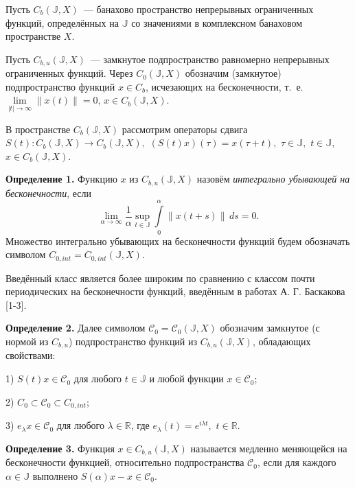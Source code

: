 


\vzmscaption


Пусть $C_b(\mathbb{J},X)$~--- банахово пространство непрерывных ограниченных функций,
определённых на $\mathbb{J}$ со значениями в комплексном банаховом пространстве $X$.

Пусть $C_{b,u}(\mathbb{J},X)$~--- замкнутое подпространство равномерно непрерывных ограниченных функций. Через $C_0(\mathbb{J},X)$ обозначим (замкнутое) подпространство функций $x\in C_b$,
 исчезающих на бесконечности, т.~е. $\lim\limits_{|t|\rightarrow\infty}\|x(t)\|=0$, $x\in C_b(\mathbb{J},X)$.

В пространстве $C_{b}(\mathbb{J},X)$ рассмотрим операторы сдвига $S(t):C_{b}(\mathbb{J},X)\rightarrow C_{b}(\mathbb{J},X),$ $(S(t)x)(\tau) = x(\tau + t),$ $\tau\in\mathbb{J},$ $t\in\mathbb{J},$ $x\in C_{b}(\mathbb{J},X)$.


\textbf{Определение 1.} Функцию  $x$ из $C_{b,u}(\mathbb{J},X)$ назовём \emph{интегрально убывающей на бесконечности},
если $$\lim\limits_{\alpha\rightarrow\infty}\frac{1}{\alpha}\sup\limits_{t\in\mathbb{J}}\int\limits_0^{\alpha}\|x(t+s)\|\,ds=0.$$
Множество интегрально убывающих на бесконечности фун\-к\-ций будем обозначать символом $C_{0,int}=C_{0,int}(\mathbb{J},X)$.

Введённый класс является более широким по сравнению с
классом почти периодических на бесконечности функций, введённым в работах А. Г.
Баскакова [1-3].

\textbf{Определение 2.} Далее символом $\mathcal{C}_0=\mathcal{C}_0(\mathbb{J},X)$ обозначим замкнутое (с нормой из $C_{b,u}$) подпространство функций из $C_{b,u}(\mathbb{J},X)$, обладающих свойствами:

1) $S(t)x\in \mathcal{C}_0$ для любого $t\in\mathbb{J}$ и любой функции $x\in\mathcal{C}_0$;

2) $C_0 \subset \mathcal{C}_0 \subset C_{0,int}$;

3) $e_{\lambda}x \in \mathcal{C}_0$ для любого $\lambda\in\mathbb{R}$, где $e_{\lambda}(t)=e^{i\lambda t},$ $t\in\mathbb{R}$.


\textbf{Определение 3.}
Функция $x\in C_{b,u}(\mathbb{J},X)$ называется медленно
меняющейся на бесконечности функцией, относительно подпространства $\mathcal{C}_0$, если для каждого $\alpha \in \mathbb{J}$ выполнено $S(\alpha)x-x\in \mathcal{C}_{0}$.




